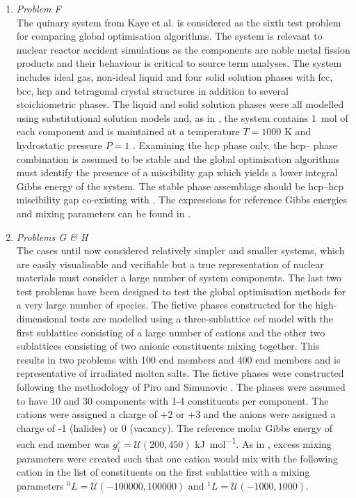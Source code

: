 \begin{enumerate}
	\item	\emph{Problem F}\\
		The quinary  system from Kaye {et al.} \cite{Kaye07} is considered as the sixth test problem for comparing global optimisation algorithms. The system is relevant to nuclear reactor accident simulations as the components are noble metal fission products and their behaviour is critical to source term analyses. The system includes ideal gas, non-ideal liquid and four solid solution phases with \gls{fcc}, \gls{bcc}, \gls{hcp} and tetragonal crystal structures in addition to several stoichiometric phases. The liquid and solid solution phases were all modelled using substitutional solution models and, as in \cite{Piro16}, the system contains \SI{1}{\mole} of each component and is maintained at a temperature $T = 1000$ \si{\kelvin} and hydrostatic pressure $P=1$ \si{\atmosphere}. Examining the \gls{hcp} phase only, the \gls{hcp}-- phase combination is assumed to be stable and the global optimisation algorithms must identify the presence of a miscibility gap which yields a lower integral Gibbs energy of the system. The stable phase assemblage should be \gls{hcp}--\gls{hcp} miscibility gap co-existing with . The expressions for reference Gibbs energies and mixing parameters can be found in \cite{Kaye07}.
	
	\item	\emph{Problems G \& H}\\
		The cases until now considered relatively simpler and smaller systems, which are easily visualisable and verifiable but a true representation of nuclear materials must consider a large number of system components. The last two test problems have been designed to test the global optimisation methods for a very large number of species. The fictive phases constructed for the high-dimensional tests are modelled using a three-sublattice \gls{cef} model with the first sublattice consisting of a large number of cations and the other two sublattices consisting of two anionic constituents mixing together. This results in two problems with 100 end members and 400 end members and is representative of irradiated molten salts. The fictive phases were constructed following the methodology of Piro and Simunovic \cite{Piro16}. The phases were assumed to have 10 and 30 components with 1-4 constituents per component. The cations were assigned a charge of +2 or +3 and the anions were assigned a charge of -1 (halides) or 0 (vacancy). The reference molar Gibbs energy of each end member was $g_i^\circ = \mathcal{U}(200, 450)$ \si{\kilo \joule \per \mole}. As in \cite{Piro16}, excess mixing parameters were created such that one cation would mix with the following cation in the list of constituents on the first sublattice with a mixing parameters ${^0}L = \mathcal{U}(-100000, 100000)$ and ${^1}L = \mathcal{U}(-1000, 1000)$.			
	\end{enumerate}

